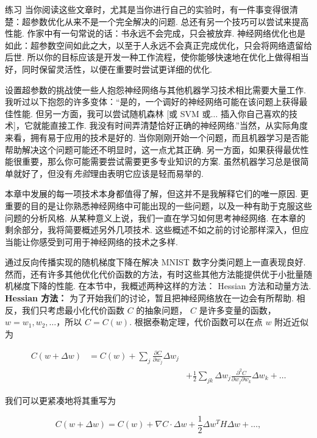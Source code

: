 \begin{exerciseBox}{练习}
当你阅读这些文章时，尤其是当你进行自己的实验时，有一件事变得很清楚：超参数优化从来不是一个完全解决的问题. 总还有另一个技巧可以尝试来提高性能. 作家中有一句常说的话：书永远不会完成，只会被放弃. 神经网络优化也是如此：超参数空间如此之大，以至于人永远不会真正完成优化，只会将网络遗留给后世. 所以你的目标应该是开发一种工作流程，使你能够快速地在优化上做得相当好，同时保留灵活性，以便在重要时尝试更详细的优化.

设置超参数的挑战使一些人抱怨神经网络与其他机器学习技术相比需要大量工作. 我听过以下抱怨的许多变体：``是的，一个调好的神经网络可能在该问题上获得最佳性能. 但另一方面，我可以尝试随机森林 [或 SVM 或$\ldots$ 插入你自己喜欢的技术]，它就能直接工作. 我没有时间弄清楚恰好正确的神经网络.''当然，从实际角度来看，拥有易于应用的技术是好的. 当你刚刚开始一个问题，而且机器学习是否能帮助解决这个问题可能还不明显时，这一点尤其正确. 另一方面，如果获得最优性能很重要，那么你可能需要尝试需要更多专业知识的方案. 虽然机器学习总是很简单就好了，但没有\emph{先验}理由表明它应该是轻而易举的.

\end{exerciseBox}

本章中发展的每一项技术本身都值得了解，但这并不是我解释它们的唯一原因. 更重要的目的是让你熟悉神经网络中可能出现的一些问题，以及一种有助于克服这些问题的分析风格. 从某种意义上说，我们一直在学习如何思考神经网络. 在本章的剩余部分，我将简要概述另外几项技术. 这些概述不如之前的讨论那样深入，但应当能让你感受到可用于神经网络的技术之多样.

通过反向传播实现的随机梯度下降在解决 MNIST 数字分类问题上一直表现良好. 然而，还有许多其他优化代价函数的方法，有时这些其他方法能提供优于小批量随机梯度下降的性能. 在本节中，我概述两种这样的方法： Hessian 方法和动量方法. \textbf{Hessian 方法：} 为了开始我们的讨论，暂且把神经网络放在一边会有所帮助. 相反，我们只考虑最小化代价函数 $C$ 的抽象问题， $C$ 是许多变量的函数， $w = w_1, w_2, \ldots$，所以 $C = C(w)$. 根据泰勒定理，代价函数可以在点 $w$ 附近近似为

\begin{align}
C(w+\Delta w) &= C(w) + \sum_j \frac{\partial C}{\partial w_j} \Delta w_j \nonumber \\ & & + \frac{1}{2} \sum_{jk} \Delta w_j \frac{\partial^2 C}{\partial w_j \partial w_k} \Delta w_k + \ldots \tag{103}
\end{align}

\noindent 我们可以更紧凑地将其重写为

\begin{equation}
C(w+\Delta w) = C(w) + \nabla C \cdot \Delta w + \frac{1}{2} \Delta w^T H \Delta w + \ldots,
\tag{104}
\end{equation}

